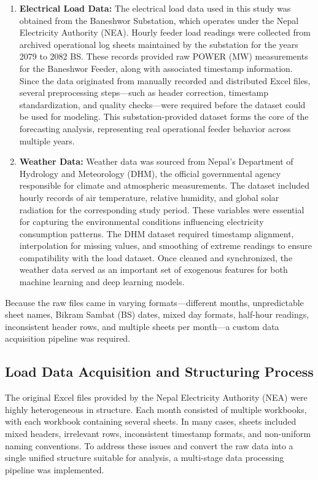 \documentclass[oneside, 12pt]{book}
\numberwithin{equation}{chapter}
\newcommand{\sizexii}{\fontsize{12pt}{6pt}\selectfont}
\begin{document}
\begin{enumerate}
    \item[a)] \textbf{Electrical Load Data:} The electrical load data used in this study was obtained from the Baneshwor Substation, which operates under the Nepal Electricity Authority (NEA). Hourly feeder load readings were collected from archived operational log sheets maintained by the substation for the years 2079 to 2082 BS. These records provided raw POWER (MW) measurements for the Baneshwor Feeder, along with associated timestamp information. Since the data originated from manually recorded and distributed Excel files, several preprocessing steps---such as header correction, timestamp standardization, and quality checks---were required before the dataset could be used for modeling. This substation-provided dataset forms the core of the forecasting analysis, representing real operational feeder behavior across multiple years.
    
    \item[b)] \textbf{Weather Data:} Weather data was sourced from Nepal's Department of Hydrology and Meteorology (DHM), the official governmental agency responsible for climate and atmospheric measurements. The dataset included hourly records of air temperature, relative humidity, and global solar radiation for the corresponding study period. These variables were essential for capturing the environmental conditions influencing electricity consumption patterns. The DHM dataset required timestamp alignment, interpolation for missing values, and smoothing of extreme readings to ensure compatibility with the load dataset. Once cleaned and synchronized, the weather data served as an important set of exogenous features for both machine learning and deep learning models.
\end{enumerate}

Because the raw files came in varying formats---different months, unpredictable sheet names, Bikram Sambat (BS) dates, mixed day formats, half-hour readings, inconsistent header rows, and multiple sheets per month---a custom data acquisition pipeline was required.

\subsection{\sizexii Load Data Acquisition and Structuring Process}

The original Excel files provided by the Nepal Electricity Authority (NEA) were highly heterogeneous in structure. Each month consisted of multiple workbooks, with each workbook containing several sheets. In many cases, sheets included mixed headers, irrelevant rows, inconsistent timestamp formats, and non-uniform naming conventions. To address these issues and convert the raw data into a single unified structure suitable for analysis, a multi-stage data processing pipeline was implemented.
\end{document}
